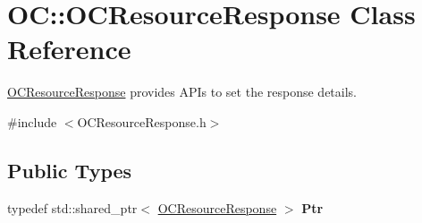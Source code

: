 \hypertarget{classOC_1_1OCResourceResponse}{}\section{O\+C\+:\+:O\+C\+Resource\+Response Class Reference}
\label{classOC_1_1OCResourceResponse}


\hyperlink{classOC_1_1OCResourceResponse}{O\+C\+Resource\+Response} provides A\+P\+Is to set the response details.  




{\ttfamily \#include $<$O\+C\+Resource\+Response.\+h$>$}

\subsection*{Public Types}
\begin{DoxyCompactItemize}
\item 
\hypertarget{classOC_1_1OCResourceResponse_aa1041e7d85a532f1ae0896d3a1d8d5aa}{}typedef std\+::shared\+\_\+ptr$<$ \hyperlink{classOC_1_1OCResourceResponse}{O\+C\+Resource\+Response} $>$ {\bfseries Ptr}\label{classOC_1_1OCResourceResponse_aa1041e7d85a532f1ae0896d3a1d8d5aa}

\end{DoxyCompactItemize}

